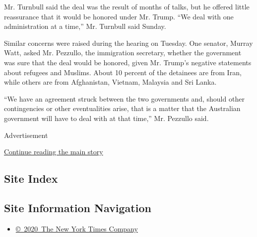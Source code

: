 Mr. Turnbull said the deal was the result of months of talks, but he
offered little reassurance that it would be honored under Mr. Trump.
``We deal with one administration at a time,'' Mr. Turnbull said Sunday.

Similar concerns were raised during the hearing on Tuesday. One senator,
Murray Watt, asked Mr. Pezzullo, the immigration secretary, whether the
government was sure that the deal would be honored, given Mr. Trump's
negative statements about refugees and Muslims. About 10 percent of the
detainees are from Iran, while others are from Afghanistan, Vietnam,
Malaysia and Sri Lanka.

``We have an agreement struck between the two governments and, should
other contingencies or other eventualities arise, that is a matter that
the Australian government will have to deal with at that time,'' Mr.
Pezzullo said.

Advertisement

\protect\hyperlink{after-bottom}{Continue reading the main story}

\hypertarget{site-index}{%
\subsection{Site Index}\label{site-index}}

\hypertarget{site-information-navigation}{%
\subsection{Site Information
Navigation}\label{site-information-navigation}}

\begin{itemize}
\tightlist
\item
  \href{https://help.nytimes.com/hc/en-us/articles/115014792127-Copyright-notice}{©~2020~The
  New York Times Company}
\end{itemize}

